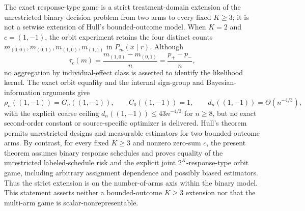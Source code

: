 The exact response-type game is a strict treatment-domain extension of the unrestricted binary decision problem from two arms to every fixed \(K\geq3\); it is not a setwise extension of Hull's bounded-outcome model. When \(K=2\) and \(c=(1,-1)\), the orbit experiment retains the four distinct counts \(m_{(0,0)},m_{(0,1)},m_{(1,0)},m_{(1,1)}\) in \(P_m(x\mid r)\). Although
\[
 \tau_c(m)=\frac{m_{(1,0)}-m_{(0,1)}}n=\frac{p_+-p_-}{n},
\]
no aggregation by individual-effect class is asserted to identify the likelihood kernel. The exact orbit equality and the internal sign-group and Bayesian-information arguments give
\[
 \rho_n((1,-1))=G_n((1,-1)),
 \qquad C_0((1,-1))=1,
 \qquad d_n((1,-1))=\Theta(n^{-4/3}),
\]
with the explicit coarse ceiling \(d_n((1,-1))\leq43n^{-4/3}\) for \(n\geq8\), but no exact second-order constant or source-specific optimizer is delivered. Hull's theorem permits unrestricted designs and measurable estimators for two bounded-outcome arms. By contrast, for every fixed \(K\geq3\) and nonzero zero-sum \(c\), the present theorem assumes binary response schedules and proves equality of the unrestricted labeled-schedule risk and the explicit joint \(2^K\)-response-type orbit game, including arbitrary assignment dependence and possibly biased estimators. Thus the strict extension is on the number-of-arms axis within the binary model. This statement asserts neither a bounded-outcome \(K\geq3\) extension nor that the multi-arm game is scalar-nonrepresentable.
